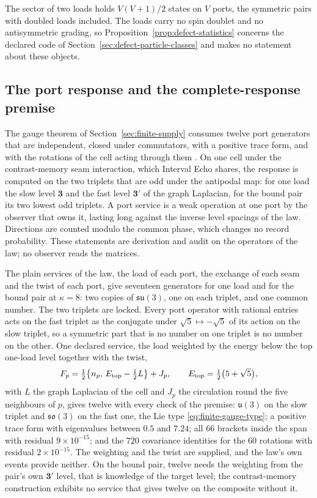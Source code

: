 The sector of two loads holds $V(V+1)/2$ states on $V$ ports, the symmetric pairs with
doubled loads included. The loads carry no spin doublet and no antisymmetric grading, so
Proposition~\ref{prop:defect-statistics} concerns the declared code of
Section~\ref{sec:defect-particle-classes} and makes no statement about these objects.

\subsection{The port response and the complete-response premise}
\label{sec:cms-response}

The gauge theorem of Section~\ref{sec:finite-supply} consumes twelve port generators that
are independent, closed under commutators, with a positive trace form, and with the
rotations of the cell acting through them \cite{ophGauge}. On one cell under the
contrast-memory seam interaction, which Interval Echo shares, the response is computed on
the two triplets that are odd under the antipodal map: for one load the slow level
$\mathbf3$ and the fast level $\mathbf3'$ of the graph Laplacian, for the bound pair its
two lowest odd triplets. A port service is a weak operation at one port by the observer
that owns it, lasting long against the inverse level spacings of the law. Directions are counted modulo the common phase, which changes no
record probability. These statements are derivation and audit on the operators of the
law; no observer reads the matrices.

The plain services of the law, the load of each port, the exchange of each seam and the
twist of each port, give seventeen generators for one load and for the bound pair at
$\kappa=8$: two copies of $\mathfrak{su}(3)$, one on each triplet, and one common number.
The two triplets are locked. Every port operator with rational entries acts on the fast
triplet as the conjugate under $\sqrt5\mapsto-\sqrt5$ of its action on the slow triplet,
so a symmetric part that is no number on one triplet is no number on the other. One
declared service, the load weighted by the energy below the top one-load level together
with the twist,
\[
 F_p=\tfrac12\bigl\{n_p,\,E_{\rm top}-\tfrac12L\bigr\}+J_p,\qquad
 E_{\rm top}=\tfrac12\bigl(5+\sqrt5\bigr),
\]
with $L$ the graph Laplacian of the cell and $J_p$ the circulation round the five
neighbours of $p$, gives twelve with every
check of the premise: $\mathfrak u(3)$ on the slow triplet and $\mathfrak{so}(3)$ on the
fast one, the Lie type \eqref{eq:finite-gauge-type}; a positive trace form with
eigenvalues between $0.5$ and $7.24$; all $66$ brackets inside the span with residual
$9\times10^{-15}$; and the $720$ covariance identities for the $60$ rotations with
residual $2\times10^{-15}$. The weighting and the twist are supplied, and the law's own
events provide neither. On the bound pair, twelve needs the weighting from the pair's own
$\mathbf3'$ level, that is knowledge of the target level; the contrast-memory construction
exhibits no service that gives twelve on the composite without it.

